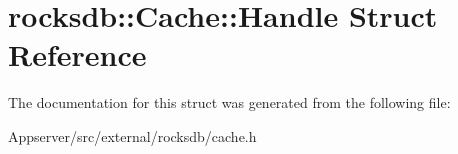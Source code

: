 \hypertarget{structrocksdb_1_1Cache_1_1Handle}{}\section{rocksdb\+:\+:Cache\+:\+:Handle Struct Reference}
\label{structrocksdb_1_1Cache_1_1Handle}


The documentation for this struct was generated from the following file\+:\begin{DoxyCompactItemize}
\item 
Appserver/src/external/rocksdb/cache.\+h\end{DoxyCompactItemize}
